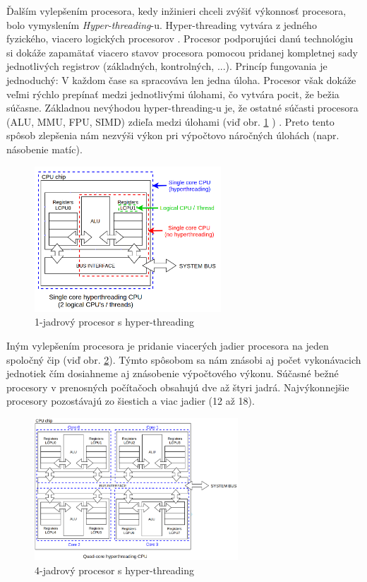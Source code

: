 \documentclass[conference]{IEEEtran}
\begin{document}
Ďalším vylepšením procesora, kedy inžinieri chceli zvýšiť výkonnosť procesora, bolo vymyslením \textit{Hyper-threading}-u. Hyper-threading vytvára z jedného fyzického, viacero logických procesorov \cite{hyperthreading}. Procesor podporujúci danú technológiu si dokáže zapamätať viacero stavov procesora pomocou pridanej kompletnej sady jednotlivých registrov (základných, kontrolných, ...).  
Princíp fungovania je jednoduchý: V každom čase sa spracováva len jedna úloha. Procesor však dokáže veľmi rýchlo prepínať medzi jednotlivými úlohami, čo vytvára pocit, že bežia súčasne. \newline
Základnou nevýhodou hyper-threading-u je, že ostatné súčasti procesora (ALU, MMU, FPU, SIMD) zdieľa medzi úlohami (viď obr. \ref{img} \cite{picture}) \cite{hyper2}. Preto tento spôsob zlepšenia nám nezvýši výkon pri výpočtovo náročných úlohách (napr. násobenie matíc).

\begin{figure}[!h]
\centering
\includegraphics[width=2.75in]{img/hyper}
\caption{1-jadrový procesor s hyper-threading \label{img}}
\end{figure}

Iným vylepšením procesora je pridanie viacerých jadier procesora na jeden spoločný čip (viď obr. \ref{quad}\cite{picture}). Týmto spôsobom sa nám znásobi aj počet vykonávacich jednotiek 
čím dosiahneme aj znásobenie výpočtového výkonu. Súčasné bežné procesory v prenosných počítačoch obsahujú dve až štyri jadrá. Najvýkonnejšie procesory pozostávajú zo šiestich a viac jadier (12 až 18).  

\begin{figure}[!h]
\centering
\includegraphics[width=3in]{img/quad}
\caption{4-jadrový procesor s hyper-threading \label{quad}}
\end{figure}
\end{document}
